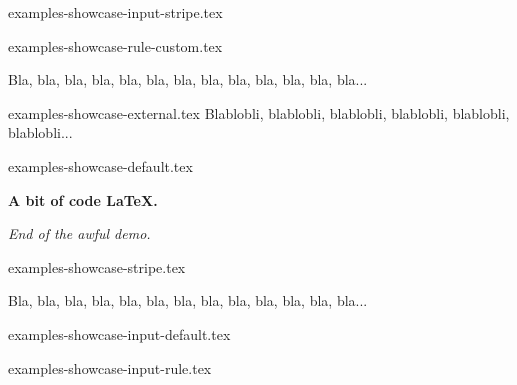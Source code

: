\begin{filecontents*}[overwrite]{examples-showcase-input-stripe.tex}
\end{filecontents*}


\begin{filecontents*}[overwrite]{examples-showcase-rule-custom.tex}
\begin{tdocshowcase}[style      = rule,
                     col-stripe = red,
                     col-text   = orange!75!black,
                     before     = My beginning,
                     after      = My end]
    Bla, bla, bla, bla, bla, bla, bla, bla, bla, bla, bla, bla, bla...
\end{tdocshowcase}
\end{filecontents*}


\begin{filecontents*}[overwrite]{examples-showcase-external.tex}
Blablobli, blablobli, blablobli, blablobli, blablobli, blablobli...
\end{filecontents*}


\begin{filecontents*}[overwrite]{examples-showcase-default.tex}
\begin{tdocshowcase}
    \bfseries A bit of code \LaTeX.

    \bigskip

    \emph{\large End of the awful demo.}
\end{tdocshowcase}
\end{filecontents*}


\begin{filecontents*}[overwrite]{examples-showcase-stripe.tex}
\begin{tdocshowcase}[style = stripe]
    Bla, bla, bla, bla, bla, bla, bla, bla, bla, bla, bla, bla, bla...
\end{tdocshowcase}
\end{filecontents*}


\begin{filecontents*}[overwrite]{examples-showcase-input-default.tex}
\end{filecontents*}


\begin{filecontents*}[overwrite]{examples-showcase-input-rule.tex}
\end{filecontents*}



